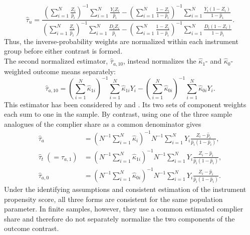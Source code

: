 \documentclass[12pt, a4paper, oneside]{article}
\theoremstyle{plain}
\theoremstyle{definition}
\begin{document}
\begin{equation}
    \hat\tau_u =
    \frac{
        \left(\sum_{i=1}^N \frac{Z_i}{\hat p_i}\right)^{-1}
        \sum_{i=1}^N \frac{Y_iZ_i}{\hat p_i}
        -
        \left(\sum_{i=1}^N \frac{1-Z_i}{1-\hat p_i}\right)^{-1}
        \sum_{i=1}^N \frac{Y_i(1-Z_i)}{1-\hat p_i}
    }{
        \left(\sum_{i=1}^N \frac{Z_i}{\hat p_i}\right)^{-1}
        \sum_{i=1}^N \frac{D_iZ_i}{\hat p_i}
        -
        \left(\sum_{i=1}^N \frac{1-Z_i}{1-\hat p_i}\right)^{-1}
        \sum_{i=1}^N \frac{D_i(1-Z_i)}{1-\hat p_i}
    }.
    \label{eq:tau_u}
\end{equation}
Thus, the inverse-probability weights are normalized within each instrument
group before either contrast is formed. \\
The second normalized estimator, $\hat\tau_{a,10}$, instead normalizes the
$\hat\kappa_1$- and $\hat\kappa_0$-weighted outcome means separately:
\begin{equation}
    \hat\tau_{a,10} =
    \left(\sum_{i=1}^N \hat\kappa_{1i}\right)^{-1}
    \sum_{i=1}^N \hat\kappa_{1i}Y_i
    -
    \left(\sum_{i=1}^N \hat\kappa_{0i}\right)^{-1}
    \sum_{i=1}^N \hat\kappa_{0i}Y_i.
    \label{eq:tau_a10}
\end{equation}
This estimator has been considered by \citet{abadie2018econometric} and
\citet{sant2022covariate}. Its two sets of component weights each sum to one in
the sample. By contrast, using one of the three sample analogues of the complier
share as a common denominator gives
\begin{align}
    \hat\tau_a
    &=
    \left(N^{-1}\sum_{i=1}^N \hat\kappa_i\right)^{-1}
    N^{-1}\sum_{i=1}^N
    Y_i\frac{Z_i-\hat p_i}{\hat p_i(1-\hat p_i)},
    \label{eq:tau_a}\\
    \hat\tau_t\;(=\hat\tau_{a,1})
    &=
    \left(N^{-1}\sum_{i=1}^N \hat\kappa_{1i}\right)^{-1}
    N^{-1}\sum_{i=1}^N
    Y_i\frac{Z_i-\hat p_i}{\hat p_i(1-\hat p_i)},
    \label{eq:tau_t}\\
    \hat\tau_{a,0}
    &=
    \left(N^{-1}\sum_{i=1}^N \hat\kappa_{0i}\right)^{-1}
    N^{-1}\sum_{i=1}^N
    Y_i\frac{Z_i-\hat p_i}{\hat p_i(1-\hat p_i)}.
    \label{eq:tau_a0}
\end{align}
Under the identifying assumptions and consistent estimation of the instrument
propensity score, all three forms are consistent for the same population
parameter. In finite samples, however, they use a common estimated complier
share and therefore do not separately normalize the two components of the
outcome contrast.
\end{document}
